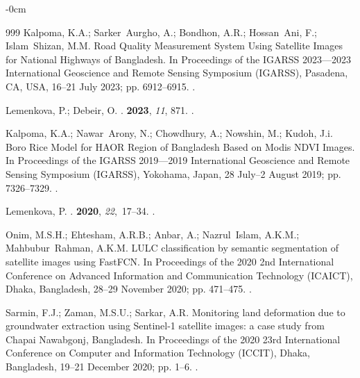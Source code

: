\documentclass[water,article,accept,pdftex,oneauhor]{Definitions/mdpi}
\begin{document}
{{{\begin{adjustwidth}{-\extralength}{0cm}
\begin{thebibliography}{999}
Kalpoma, K.A.; Sarker~Aurgho, A.; Bondhon, A.R.; Hossan~Ani, F.; Islam~Shizan,
  M.M.
\newblock Road Quality Measurement System Using Satellite Images for National
  Highways of Bangladesh.
\newblock In Proceedings of the IGARSS 2023---2023 International Geoscience and Remote Sensing Symposium
  (IGARSS), Pasadena, CA, USA, 16--21 July 2023; pp. 6912--6915.
.

Lemenkova, P.; Debeir, O.
.
 {\bf 2023}, {\em 11}, 871.
.

Kalpoma, K.A.; Nawar~Arony, N.; Chowdhury, A.; Nowshin, M.; Kudoh, J.i.
\newblock Boro Rice Model for HAOR Region of Bangladesh Based on Modis NDVI
  Images.
\newblock In Proceedings of the IGARSS 2019---2019 International Geoscience and Remote Sensing Symposium
  (IGARSS), Yokohama, Japan, 28 July--2 August 2019; pp. 7326--7329.
.

Lemenkova, P.
.
  {\bf 2020}, {\em 22},~17--34.
.

Onim, M.S.H.; Ehtesham, A.R.B.; Anbar, A.; Nazrul~Islam, A.K.M.;
  Mahbubur~Rahman, A.K.M.
\newblock LULC classification by semantic segmentation of satellite images
  using FastFCN.
\newblock In Proceedings of the 2020 2nd International Conference on Advanced
  Information and Communication Technology (ICAICT), Dhaka, Bangladesh, 28--29 November  2020; pp. 471--475.
.

Sarmin, F.J.; Zaman, M.S.U.; Sarkar, A.R.
\newblock Monitoring land deformation due to groundwater extraction using
  Sentinel-1 satellite images: a case study from Chapai Nawabgonj, Bangladesh.
\newblock In Proceedings of the 2020 23rd International Conference on Computer
  and Information Technology (ICCIT), Dhaka, Bangladesh, 19--21 December 2020; pp. 1--6.
.


\end{thebibliography}
\end{adjustwidth}}}}
\end{document}
